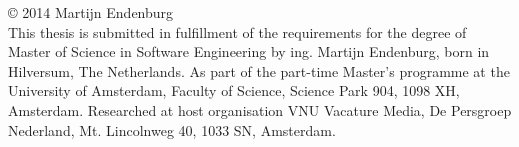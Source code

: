 \null
\vfill

\noindent\copyright{ 2014} Martijn Endenburg\\[0.3cm]
This thesis is submitted in fulfillment of the requirements for the degree of
Master of Science in Software Engineering by ing. Martijn Endenburg, born in
Hilversum, The Netherlands. As part of the part-time Master's programme at the
University of Amsterdam, Faculty of Science, Science Park 904, 1098 XH,
Amsterdam. Researched at host organisation VNU Vacature Media, De Persgroep
Nederland, Mt. Lincolnweg 40, 1033 SN, Amsterdam.
